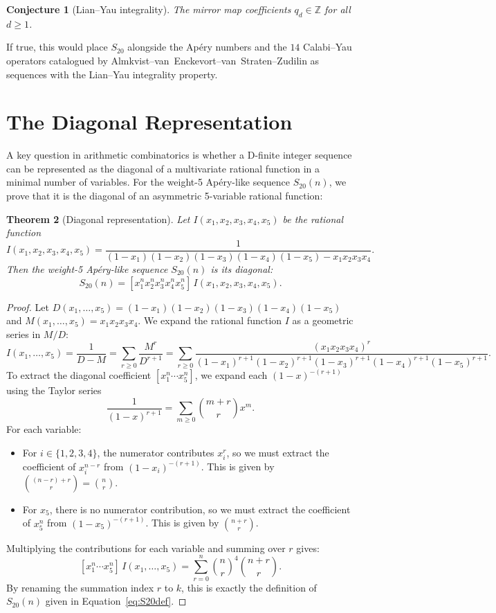 \documentclass[12pt,reqno]{amsart}
\theoremstyle{plain}
\newtheorem{theorem}{Theorem}[section]
\newtheorem{conjecture}[theorem]{Conjecture}
\theoremstyle{definition}
\theoremstyle{remark}
\newcommand{\ZZ}{\mathbb{Z}}
\begin{document}
\begin{conjecture}[Lian--Yau integrality]\label{conj:LY}
The mirror map coefficients $q_d \in \ZZ$ for \emph{all} $d \ge 1$.
\end{conjecture}

If true, this would place $S_{20}$ alongside the Ap\'ery numbers
and the $14$ Calabi--Yau operators catalogued by
Almkvist--van~Enckevort--van~Straten--Zudilin as sequences with
the Lian--Yau integrality property.


\section{The Diagonal Representation}\label{sec:diagonal}

A key question in arithmetic combinatorics is whether a D-finite integer sequence can be represented as the diagonal of a multivariate rational function in a minimal number of variables. For the weight-5 Apéry-like sequence $S_{20}(n)$, we prove that it is the diagonal of an asymmetric 5-variable rational function:

\begin{theorem}[Diagonal representation]\label{thm:diagonal}
Let $I(x_1, x_2, x_3, x_4, x_5)$ be the rational function
\[
I(x_1, x_2, x_3, x_4, x_5) = \frac{1}{(1-x_1)(1-x_2)(1-x_3)(1-x_4)(1-x_5) - x_1 x_2 x_3 x_4}.
\]
Then the weight-5 Apéry-like sequence $S_{20}(n)$ is its diagonal:
\[
S_{20}(n) = [x_1^n x_2^n x_3^n x_4^n x_5^n]\, I(x_1, x_2, x_3, x_4, x_5).
\]
\end{theorem}

\begin{proof}
Let $D(x_1, \ldots, x_5) = (1-x_1)(1-x_2)(1-x_3)(1-x_4)(1-x_5)$ and $M(x_1, \ldots, x_5) = x_1 x_2 x_3 x_4$.
We expand the rational function $I$ as a geometric series in $M/D$:
\[
I(x_1, \ldots, x_5) = \frac{1}{D - M} = \sum_{r \ge 0} \frac{M^r}{D^{r+1}} = \sum_{r \ge 0} \frac{(x_1 x_2 x_3 x_4)^r}{(1-x_1)^{r+1} (1-x_2)^{r+1} (1-x_3)^{r+1} (1-x_4)^{r+1} (1-x_5)^{r+1}}.
\]
To extract the diagonal coefficient $[x_1^n \cdots x_5^n]$, we expand each $(1-x)^{-(r+1)}$ using the Taylor series
\[
\frac{1}{(1-x)^{r+1}} = \sum_{m \ge 0} \binom{m+r}{r} x^m.
\]
For each variable:
\begin{itemize}
\item For $i \in \{1, 2, 3, 4\}$, the numerator contributes $x_i^r$, so we must extract the coefficient of $x_i^{n-r}$ from $(1-x_i)^{-(r+1)}$. This is given by $\binom{(n-r)+r}{r} = \binom{n}{r}$.
\item For $x_5$, there is no numerator contribution, so we must extract the coefficient of $x_5^n$ from $(1-x_5)^{-(r+1)}$. This is given by $\binom{n+r}{r}$.
\end{itemize}
Multiplying the contributions for each variable and summing over $r$ gives:
\[
[x_1^n \cdots x_5^n]\, I(x_1, \ldots, x_5) = \sum_{r=0}^n \binom{n}{r}^{\!4} \binom{n+r}{r}.
\]
By renaming the summation index $r$ to $k$, this is exactly the definition of $S_{20}(n)$ given in Equation~\eqref{eq:S20def}.
\end{proof}
\end{document}
